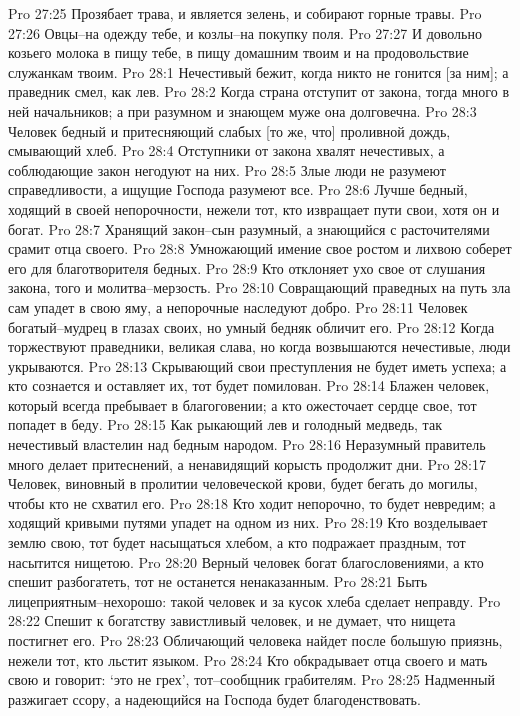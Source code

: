 Pro 27:25  Прозябает трава, и является зелень, и собирают горные травы.
Pro 27:26  Овцы--на одежду тебе, и козлы--на покупку поля.
Pro 27:27  И довольно козьего молока в пищу тебе, в пищу домашним твоим и на продовольствие служанкам твоим.
Pro 28:1  Нечестивый бежит, когда никто не гонится [за ним]; а праведник смел, как лев.
Pro 28:2  Когда страна отступит от закона, тогда много в ней начальников; а при разумном и знающем муже она долговечна.
Pro 28:3  Человек бедный и притесняющий слабых [то же, что] проливной дождь, смывающий хлеб.
Pro 28:4  Отступники от закона хвалят нечестивых, а соблюдающие закон негодуют на них.
Pro 28:5  Злые люди не разумеют справедливости, а ищущие Господа разумеют все.
Pro 28:6  Лучше бедный, ходящий в своей непорочности, нежели тот, кто извращает пути свои, хотя он и богат.
Pro 28:7  Хранящий закон--сын разумный, а знающийся с расточителями срамит отца своего.
Pro 28:8  Умножающий имение свое ростом и лихвою соберет его для благотворителя бедных.
Pro 28:9  Кто отклоняет ухо свое от слушания закона, того и молитва--мерзость.
Pro 28:10  Совращающий праведных на путь зла сам упадет в свою яму, а непорочные наследуют добро.
Pro 28:11  Человек богатый--мудрец в глазах своих, но умный бедняк обличит его.
Pro 28:12  Когда торжествуют праведники, великая слава, но когда возвышаются нечестивые, люди укрываются.
Pro 28:13  Скрывающий свои преступления не будет иметь успеха; а кто сознается и оставляет их, тот будет помилован.
Pro 28:14  Блажен человек, который всегда пребывает в благоговении; а кто ожесточает сердце свое, тот попадет в беду.
Pro 28:15  Как рыкающий лев и голодный медведь, так нечестивый властелин над бедным народом.
Pro 28:16  Неразумный правитель много делает притеснений, а ненавидящий корысть продолжит дни.
Pro 28:17  Человек, виновный в пролитии человеческой крови, будет бегать до могилы, чтобы кто не схватил его.
Pro 28:18  Кто ходит непорочно, то будет невредим; а ходящий кривыми путями упадет на одном из них.
Pro 28:19  Кто возделывает землю свою, тот будет насыщаться хлебом, а кто подражает праздным, тот насытится нищетою.
Pro 28:20  Верный человек богат благословениями, а кто спешит разбогатеть, тот не останется ненаказанным.
Pro 28:21  Быть лицеприятным--нехорошо: такой человек и за кусок хлеба сделает неправду.
Pro 28:22  Спешит к богатству завистливый человек, и не думает, что нищета постигнет его.
Pro 28:23  Обличающий человека найдет после большую приязнь, нежели тот, кто льстит языком.
Pro 28:24  Кто обкрадывает отца своего и мать свою и говорит: `это не грех', тот--сообщник грабителям.
Pro 28:25  Надменный разжигает ссору, а надеющийся на Господа будет благоденствовать.
